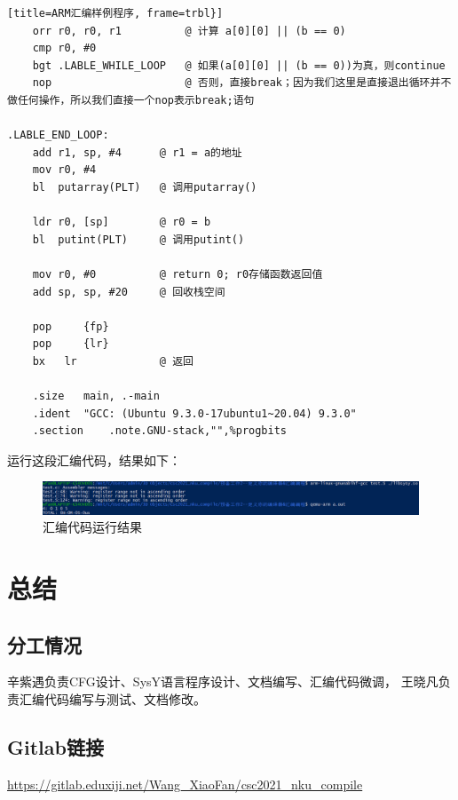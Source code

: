 \documentclass[UTF8,a4paper,10pt]{ctexart}
\begin{document}
\begin{lstlisting}[title=ARM汇编样例程序, frame=trbl}]
    orr r0, r0, r1			@ 计算 a[0][0] || (b == 0)
    cmp r0, #0
    bgt .LABLE_WHILE_LOOP	@ 如果(a[0][0] || (b == 0))为真，则continue
    nop						@ 否则，直接break；因为我们这里是直接退出循环并不做任何操作，所以我们直接一个nop表示break;语句

.LABLE_END_LOOP:
    add r1, sp, #4		@ r1 = a的地址
    mov r0, #4
    bl	putarray(PLT)   @ 调用putarray()

    ldr r0, [sp]		@ r0 = b
    bl	putint(PLT)		@ 调用putint()

    mov r0, #0			@ return 0; r0存储函数返回值
    add sp, sp, #20		@ 回收栈空间

    pop		{fp}
    pop		{lr}
    bx   lr				@ 返回
    
    .size	main, .-main
    .ident	"GCC: (Ubuntu 9.3.0-17ubuntu1~20.04) 9.3.0"
    .section	.note.GNU-stack,"",%progbits
    \end{lstlisting}

    运行这段汇编代码，结果如下：
    \begin{figure}[H]
        \centering
        \includegraphics[width=14cm]{pics/pic.png}
        \caption{汇编代码运行结果}
        \label{fig:pic}
    \end{figure}

\section{总结}
    \subsection{分工情况}
    辛紫遇负责CFG设计、SysY语言程序设计、文档编写、汇编代码微调，
    王晓凡负责汇编代码编写与测试、文档修改。

    \subsection{Gitlab链接}
    \href{https://gitlab.eduxiji.net/Wang\_XiaoFan/csc2021\_nku\_compile}{https://gitlab.eduxiji.net/Wang\_XiaoFan/csc2021\_nku\_compile}
\end{document}
